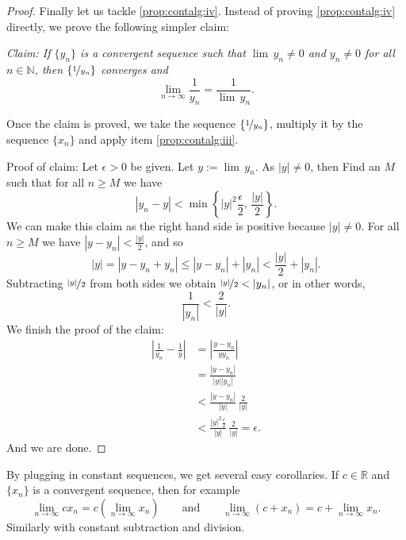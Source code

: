 \documentclass[12pt]{book}
\newcommand{\abs}[1]{\left\lvert {#1} \right\rvert}
\newcommand{\R}{{\mathbb{R}}}
\newcommand{\N}{{\mathbb{N}}}
\theoremstyle{plain}
\theoremstyle{remark}
\theoremstyle{definition}
\theoremstyle{exercise}
\theoremstyle{example}
\begin{document}
\begin{proof}
Finally let us tackle
\ref{prop:contalg:iv}.  Instead of proving 
\ref{prop:contalg:iv} directly, we prove the following simpler claim:

\emph{Claim: If $\{ y_n \}$ is a convergent sequence such that
$\lim\, y_n \not= 0$ and $y_n \not= 0$ for all $n \in \N$, then
$\{ \nicefrac{1}{y_n} \}$ converges and}
\begin{equation*}
\lim_{n\to\infty} \frac{1}{y_n} = \frac{1}{\lim\, y_n}  .
\end{equation*}

Once the claim is proved, we take the sequence $\{ \nicefrac{1}{y_n} \}$,
multiply it by the sequence $\{ x_n \}$ and apply item
\ref{prop:contalg:iii}.

Proof of claim:  Let $\epsilon > 0$ be given.
Let $y := \lim\, y_n$.
As $\abs{y} \not= 0$, then
Find an $M$ such that for all $n \geq M$
we have
\begin{equation*}
\abs{y_n - y} < \min \left\{ \abs{y}^2\frac{\epsilon}{2}, \, \frac{\abs{y}}{2}
\right\} .
\end{equation*}
We can make this claim as the right hand side is positive
because $\abs{y} \not= 0$.  For all $n \geq M$ we have
$\abs{y - y_n} < \frac{\abs{y}}{2}$, and so
\begin{equation*}
\abs{y} = 
\abs{y - y_n + y_n } \leq
\abs{y - y_n} + \abs{ y_n } < \frac{\abs{y}}{2} + \abs{y_n}.
\end{equation*}
Subtracting $\nicefrac{\abs{y}}{2}$ from both sides we obtain
$\nicefrac{\abs{y}}{2} < \abs{y_n}$, or in other words,
\begin{equation*}
\frac{1}{\abs{y_n}} < \frac{2}{\abs{y}} .
\end{equation*}
We finish the proof of the claim:
\begin{equation*}
\begin{split}
\abs{\frac{1}{y_n} - \frac{1}{y}} &=
\abs{\frac{y - y_n}{y y_n}} \\
& =
\frac{\abs{y - y_n}}{\abs{y} \abs{y_n}} \\
& <
\frac{\abs{y - y_n}}{\abs{y}} \, \frac{2}{\abs{y}} \\
& <
\frac{\abs{y}^2 \frac{\epsilon}{2}}{\abs{y}} \, \frac{2}{\abs{y}}
= \epsilon .
\end{split}
\end{equation*}
And we are done.
\end{proof}

By plugging in constant sequences, we get several easy corollaries.
If $c \in \R$ and $\{ x_n \}$ is a convergent sequence, then
for example
\begin{equation*}
\lim_{n \to \infty} c x_n = 
c \left( \lim_{n \to \infty} x_n \right) \qquad
\text{and}
\qquad
\lim_{n \to \infty} (c + x_n) = 
c + \lim_{n \to \infty} x_n .
\end{equation*}
Similarly with constant subtraction and division.
\end{document}
